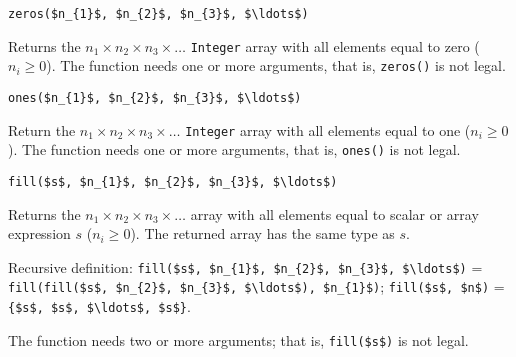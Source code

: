 \begin{operatordefinition}[zeros]
\begin{synopsis}\begin{lstlisting}
zeros($n_{1}$, $n_{2}$, $n_{3}$, $\ldots$)
\end{lstlisting}\end{synopsis}
\begin{semantics}
Returns the $n_{1} \times n_{2} \times n_{3} \times \ldots$ \lstinline!Integer! array with all elements equal to zero ($n_{i} \geq 0$).  The function needs one or more arguments, that is, \lstinline!zeros()! is not legal.
\end{semantics}
\end{operatordefinition}

\begin{operatordefinition}[ones]
\begin{synopsis}\begin{lstlisting}
ones($n_{1}$, $n_{2}$, $n_{3}$, $\ldots$)
\end{lstlisting}\end{synopsis}
\begin{semantics}
Return the $n_{1} \times n_{2} \times n_{3} \times \ldots$ \lstinline!Integer! array with all elements equal to one ($n_{i} \geq 0$).  The function needs one or more arguments, that is, \lstinline!ones()! is not legal.
\end{semantics}
\end{operatordefinition}

\begin{operatordefinition}[fill]
\begin{synopsis}\begin{lstlisting}
fill($s$, $n_{1}$, $n_{2}$, $n_{3}$, $\ldots$)
\end{lstlisting}\end{synopsis}
\begin{semantics}
Returns the $n_{1} \times n_{2} \times n_{3} \times \ldots$ array with all elements equal to scalar or array expression $s$ ($n_{i} \geq 0$).  The returned array has the same type as $s$.

Recursive definition:
\lstinline!fill($s$, $n_{1}$, $n_{2}$, $n_{3}$, $\ldots$)! =
\lstinline!fill(fill($s$, $n_{2}$, $n_{3}$, $\ldots$), $n_{1}$)!;
\lstinline!fill($s$, $n$)! = \lstinline!{$s$, $s$, $\ldots$, $s$}!.

The function needs two or more arguments; that is, \lstinline!fill($s$)! is not legal.
\end{semantics}
\end{operatordefinition}

